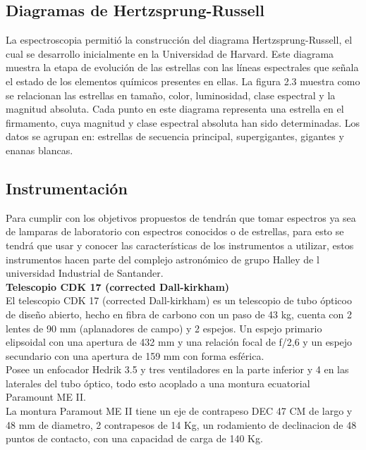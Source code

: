 






\subsection {Diagramas de Hertzsprung-Russell}


\noindent La espectroscopia permitió la construcción del diagrama Hertzsprung-Russell, el cual se desarrollo inicialmente en la Universidad de Harvard.
Este diagrama muestra la etapa de evolución de las estrellas con las líneas espectrales que señala el estado de los elementos químicos presentes en ellas. La figura 2.3 muestra como se relacionan las estrellas en tamaño, color, luminosidad, clase espectral y la magnitud absoluta. Cada punto en este diagrama representa una estrella en el firmamento, cuya magnitud y clase espectral absoluta han sido determinadas. Los datos se agrupan en: estrellas de secuencia principal, supergigantes, gigantes y enanas
blancas.




\subsection{Instrumentación}

 \noindent Para cumplir con los objetivos propuestos de tendrán que tomar espectros ya sea de lamparas de laboratorio con espectros conocidos o de estrellas, para esto se tendrá que usar y conocer las características de los instrumentos a utilizar, estos instrumentos hacen parte del complejo astronómico de grupo Halley de l universidad Industrial de Santander.\\

\noindent \textbf{ Telescopio CDK 17 (corrected Dall-kirkham)}\\

\noindent El telescopio CDK 17 (corrected Dall-kirkham) es un telescopio de tubo ópticoo de diseño abierto, hecho en fibra de carbono con un paso de 43 kg, cuenta con 2 lentes de 90 mm (aplanadores de campo) y 2 espejos. 
Un espejo primario elipsoidal con una apertura de 432 mm y una relación focal de f/2,6 y un espejo secundario con una apertura de 159 mm con forma esférica.\\
Posee un enfocador Hedrik 3.5 y tres ventiladores en la parte inferior y 4 en las laterales del tubo óptico, todo esto acoplado a una montura ecuatorial Paramount ME II.\\
La montura Paramout ME II tiene un eje de contrapeso DEC 47 CM  de largo y 48 mm de diametro, 2 contrapesos de 14 Kg, un rodamiento de declinacion de 48 puntos de contacto, con una capacidad de carga de 140 Kg.\\


